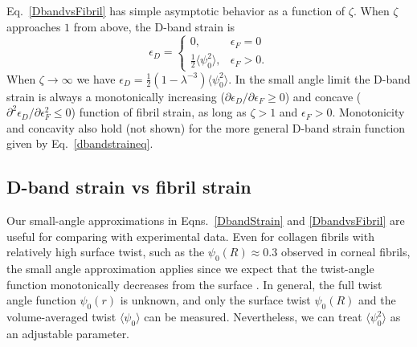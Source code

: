 \documentclass[preprint,12pt]{elsarticle}
\begin{document}
Eq.~\ref{DbandvsFibril} has simple asymptotic behavior as a function of $\zeta$. When  $\zeta$ approaches $1$ from above, the D-band strain is 
\begin{equation}
\epsilon_D = \begin{cases} 
0, & \epsilon_F=0\\
\frac{1}{2}\langle\psi_0^2\rangle, & \epsilon_F>0.
\end{cases}
\end{equation}
When $\zeta\to\infty$ we have $\epsilon_D = \frac{1}{2}\left(1 - \lambda^{-3}\right)\langle\psi_0^2\rangle$. In the small angle limit the D-band strain is always a monotonically increasing ($\partial \epsilon_D/\partial\epsilon_F \geq0$) and concave ($\partial^2 \epsilon_D/\partial\epsilon_F^2 \leq0$) function of fibril strain, as long as $\zeta>1$ and $\epsilon_F>0$.  Monotonicity and concavity also hold (not shown) for the more general D-band strain function given by Eq.~\ref{dbandstraineq}.

\subsection{D-band strain vs fibril strain}\label{cornealcompare}

Our small-angle approximations in Eqns.~\ref{DbandStrain} and \ref{DbandvsFibril} are useful for comparing with experimental data. Even for collagen fibrils with relatively high surface twist, such as the $\psi_0(R)\approx 0.3$ observed in corneal fibrils, the small angle approximation applies since we expect that the twist-angle function monotonically decreases from the surface \cite{Cameron:2020, Leighton:2021}. In general, the full twist angle function $\psi_0(r)$ is unknown, and only the surface twist $\psi_0(R)$ and the volume-averaged twist $\langle \psi_0\rangle$ can be measured. Nevertheless, we can treat $\langle\psi_0^2\rangle$ as an adjustable parameter.
\end{document}
